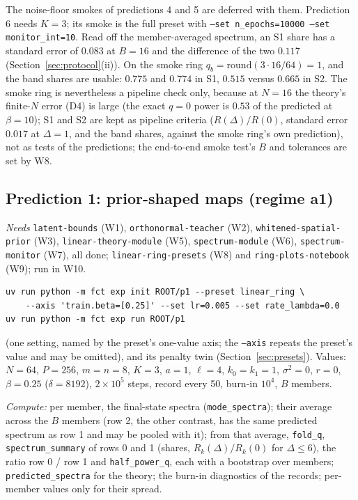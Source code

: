 \documentclass[11pt,a4paper]{article}
\newcommand{\code}[1]{\texttt{#1}}
\begin{document}
The noise-floor smokes of predictions 4 and 5 are deferred with them. Prediction 6 needs $K = 3$; its smoke is the full preset with \code{--set n\_epochs=10000 --set monitor\_int=10}. Read off the member-averaged spectrum, an S1 share has a standard error of $0.083$ at $B = 16$ and the difference of the two $0.117$ (Section~\ref{sec:protocol}(ii)). On the smoke ring $q_b = \mathrm{round}(3\cdot16/64) = 1$, and the band shares are usable: $0.775$ and $0.774$ in S1, $0.515$ versus $0.665$ in S2. The smoke ring is nevertheless a pipeline check only, because at $N = 16$ the theory's finite-$N$ error (D4) is large (the exact $q = 0$ power is $0.53$ of the predicted at $\beta = 10$); S1 and S2 are kept as pipeline criteria ($R(\Delta)/R(0)$, standard error $0.017$ at $\Delta = 1$, and the band shares, against the smoke ring's own prediction), not as tests of the predictions; the end-to-end smoke test's $B$ and tolerances are set by W8.

\subsection{Prediction 1: prior-shaped maps (regime a1)}
\label{sec:P1}
\emph{Needs} \code{latent-bounds} (W1), \code{orthonormal-teacher} (W2), \code{whitened-spatial-prior} (W3), \code{linear-theory-module} (W5), \code{spectrum-module} (W6), \code{spectrum-monitor} (W7), all done; \code{linear-ring-presets} (W8) and \code{ring-plots-notebook} (W9); run in W10.
\begin{verbatim}
uv run python -m fct exp init ROOT/p1 --preset linear_ring \
    --axis 'train.beta=[0.25]' --set lr=0.005 --set rate_lambda=0.0
uv run python -m fct exp run ROOT/p1
\end{verbatim}
(one setting, named by the preset's one-value axis; the \code{--axis} repeats the preset's value and may be omitted), and its penalty twin (Section~\ref{sec:presets}). Values: $N = 64$, $P = 256$, $m = n = 8$, $K = 3$, $a = 1$, $\ell = 4$, $k_0 = k_1 = 1$, $\sigma^2 = 0$, $r = 0$, $\beta = 0.25$ ($\delta = 8192$), $2\times10^5$ steps, record every 50, burn-in $10^4$, $B$ members.

\emph{Compute:} per member, the final-state spectra (\code{mode\_spectra}); their average across the $B$ members (row 2, the other contrast, has the same predicted spectrum as row 1 and may be pooled with it); from that average, \code{fold\_q}, \code{spectrum\_summary} of rows 0 and 1 (shares, $R_k(\Delta)/R_k(0)$ for $\Delta\le6$), the ratio row 0 / row 1 and \code{half\_power\_q}, each with a bootstrap over members; \code{predicted\_spectra} for the theory; the burn-in diagnostics of the records; per-member values only for their spread.
\end{document}
